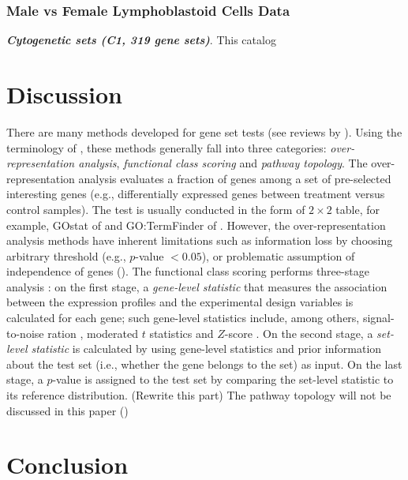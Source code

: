 \documentclass[11pt, a4paper]{article}
\begin{document}
		\subsubsection*{Male vs Female Lymphoblastoid Cells Data}
			\textit{\textbf{Cytogenetic sets (C1, 319 gene sets)}}. This catalog
		
		
	\section{Discussion}
		 
		 There are many methods developed for gene set tests (see reviews by  \cite{huang2009bioinformatics, khatri2012ten, tarca2013comparison}). Using the terminology of \cite{khatri2012ten}, these methods generally fall into three categories: \textit{over-representation analysis}, \textit{functional class scoring} and \textit{pathway topology}. The over-representation analysis evaluates a fraction of genes among a set of pre-selected interesting genes (e.g., differentially expressed genes between treatment versus control samples). The test is usually conducted in the form of $2\times 2$ table, for example, GOstat of \cite{klebanov2007multivariate} and GO:TermFinder of \cite{tian2005discovering}. However, the over-representation analysis methods have inherent limitations such as information loss by choosing arbitrary threshold (e.g., $p$-value $< 0.05$), or problematic assumption of independence of genes (\cite{goeman2007analyzing, wu2012camera}). The functional class scoring performs three-stage analysis \citep{khatri2012ten}: on the first stage, a \textit{gene-level statistic} that measures the association between the expression profiles and the experimental design variables is calculated for each gene; such gene-level statistics include, among others, signal-to-noise ration \citep{subramanian2005gene}, moderated $t$ statistics \citep{Smyth2004moderated} and  $Z$-score \citep{efron2007correlation}. On the second stage, a \textit{set-level statistic} is calculated by using gene-level statistics and prior information about the test set (i.e., whether the gene belongs to the set) as input. On the last stage, a $p$-value is assigned to the test set by comparing the set-level statistic to its reference distribution.  (Rewrite this part)		 
		 The pathway topology will not be discussed in this paper (\cite{khatri2012ten, tarca2013comparison})
		 	
	\section{Conclusion}\label{section:conclusion}
	
\end{document}
